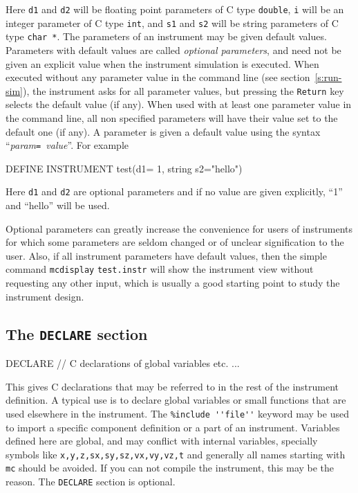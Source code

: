 Here \verb+d1+ and \verb+d2+ will be floating point parameters of C type
\verb+double+, \verb+i+ will be an integer parameter of C type \verb+int+, and
\verb+s1+ and \verb+s2+ will be string parameters of C type \verb+char *+.
 The parameters of an instrument may
be given default values. Parameters with default values are called
\emph{optional parameters}, and need not be given an explicit value when the
instrument simulation is executed. When executed without any parameter value in
the command line (see section~\ref{s:run-sim}), the instrument asks for all
parameter values, but pressing the \verb+Return+ key selects the default value
(if any). When used with at least one parameter value in the command line, all
non specified parameters will have their value set to the default one (if
any). A parameter is given a default value using the syntax
``\textit{param}\texttt{= }\textit{value}''.  For example
\begin{mcstas}
DEFINE INSTRUMENT test(d1= 1, string s2="hello")
\end{mcstas}
Here \verb+d1+ and \verb+d2+ are optional parameters and if no
value are given explicitly, ``1'' and ``hello'' will be used.

Optional parameters can greatly increase the convenience for users of
instruments for which some parameters are seldom changed or of unclear
signification to the user. Also, if all instrument parameters have default
values, then the simple command \verb+mcdisplay+ \verb+test.instr+ will show the
instrument view without requesting any other input, which is usually a good
starting point to study the instrument design.

\subsection{The \texttt{DECLARE} section}
\label{s:declare}

\begin{mcstas}
DECLARE
   // C declarations of global variables etc. ...
\end{mcstas} 
 This gives C declarations that may be
referred to in the rest of the instrument definition. A typical use is to
declare global variables or small functions that are used elsewhere in the
instrument. The \verb+%include ''file''+ keyword may be used to import a
specific
component definition or a part of an instrument. Variables defined here are
global, and may conflict with internal \MCS variables, specially symbols like
\verb+x,y,z,sx,sy,sz,vx,vy,vz,t+ and generally all names starting with \verb+mc+
should be avoided. If you can not compile the instrument, this may be the
reason. The \texttt{DECLARE} section is optional.

